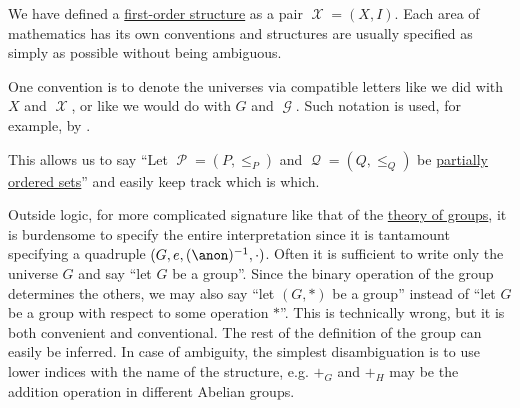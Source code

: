 \begin{remark}\label{rem:fol_structure_notation}
  We have defined a \hyperref[def:fol_structure]{first-order structure} as a pair \( \mscrX = (X, I) \). Each area of mathematics has its own conventions and structures are usually specified as simply as possible without being ambiguous.

  One convention is to denote the universes via compatible letters like we did with \( X \) and \( \mscrX \), or like we would do with \( G \) and \( \mscrG \). Such notation is used, for example, by \textcite[def. II.1.2]{Эдельман1975Логика}.

  This allows us to say \enquote{Let \( \mscrP = (P, \leq_P) \) and \( \mscrQ = (Q, \leq_Q) \) be \hyperref[def:partially_ordered_set]{partially ordered sets}} and easily keep track which is which.

  Outside logic, for more complicated signature like that of the \hyperref[def:group/theory]{theory of groups}, it is burdensome to specify the entire interpretation since it is tantamount specifying a quadruple \( (G, e, (\anon)^{-1}, \cdot) \). Often it is sufficient to write only the universe \( G \) and say \enquote{let \( G \) be a group}. Since the binary operation of the group determines the others, we may also say \enquote{let \( (G, \ast) \) be a group} instead of \enquote{let \( G \) be a group with respect to some operation \( {\ast} \)}. This is technically wrong, but it is both convenient and conventional. The rest of the definition of the group can easily be inferred. In case of ambiguity, the simplest disambiguation is to use lower indices with the name of the structure, e.g. \( +_G \) and \( +_H \) may be the addition operation in different Abelian groups.
\end{remark}

